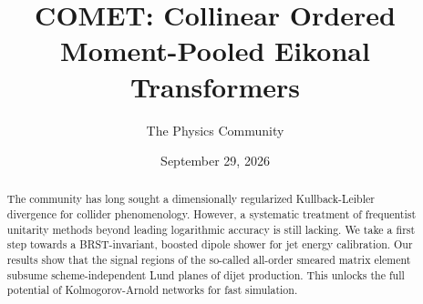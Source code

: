\documentclass[11pt]{article}
\title{COMET: Collinear Ordered Moment-Pooled Eikonal Transformers}
\author{The Physics Community}
\date{September 29, 2026}
\begin{document}
\maketitle
\begin{abstract}
The community has long sought a dimensionally regularized
Kullback-Leibler divergence for collider phenomenology. However, a
systematic treatment of frequentist unitarity methods beyond leading
logarithmic accuracy is still lacking. We take a first step towards a
BRST-invariant, boosted dipole shower for jet energy calibration. Our
results show that the signal regions of the so-called all-order smeared
matrix element subsume scheme-independent Lund planes of dijet
production. This unlocks the full potential of Kolmogorov-Arnold
networks for fast simulation.
\end{abstract}
\tableofcontents





\nocite{*}


\end{document}
